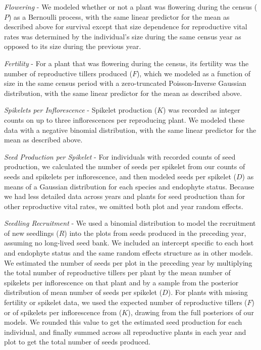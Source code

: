 \documentclass[9pt,twocolumn,twoside]{pnas-new}
\begin{document}
{\emph{Flowering} - We modeled whether or not a plant was flowering during the census ($P$) as a Bernoulli process, with the same linear predictor for the mean as described above for survival except that size dependence for reproductive vital rates was determined by the individual's size during the same census year as opposed to its size during the previous year.

\emph{Fertility} - For a plant that was flowering during the census, its fertility was the number of reproductive tillers produced ($F$), which we modeled as a function of size in the same census period with a zero-truncated Poisson-Inverse Gaussian distribution, with the same linear predictor for the mean as described above. 

\emph{Spikelets per Inflorescence} - Spikelet production ($K$) was recorded as integer counts on up to three inflorescences per reproducing plant.
We modeled these data with a negative binomial distribution, with the same linear predictor for the mean as described above. 

\emph{Seed Production per Spikelet} - For individuals with recorded counts of seed production, we calculated the number of seeds per spikelet from our counts of seeds and spikelets per inflorescence, and then modeled seeds per spikelet ($D$) as means of a Gaussian distribution for each species and endophyte status. 
Because we had less detailed data across years and plants for seed production than for other reproductive vital rates, we omitted both plot and year random effects. 

\emph{Seedling Recruitment} - We used a binomial distribution to model the recruitment of new seedlings ($R$) into the plots from seeds produced in the preceding year, assuming no long-lived seed bank. 
We included an intercept specific to each host and endophyte status and the same random effects structure as in other models. 
We estimated the number of seeds per plot in the preceding year by multiplying the total number of reproductive tillers per plant by the mean number of spikelets per inflorescence on that plant and by a sample from the posterior distribution of mean number of seeds per spikelet ($D$).
For plants with missing fertility or spikelet data, we used the expected number of reproductive tillers ($F$) or of spikelets per inflorescence from ($K$), drawing from the full posteriors of our models. 
We rounded this value to get the estimated seed production for each individual, and finally summed across all reproductive plants in each year and plot to get the total number of seeds produced. 

}
\end{document}
